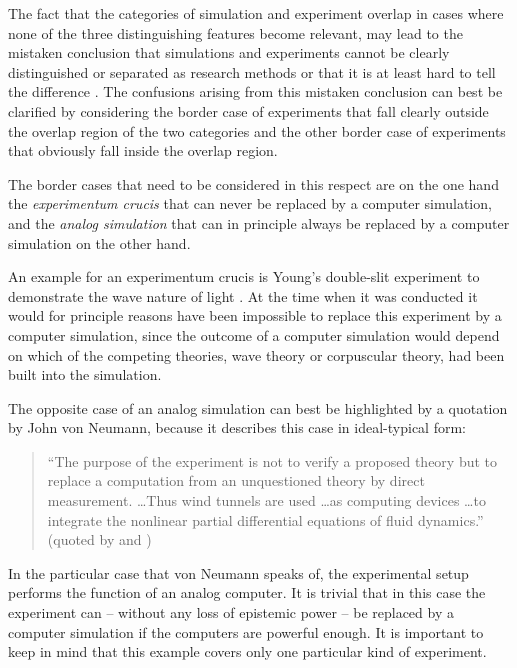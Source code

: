 \documentclass[onecollarge]{STJour}
\numberwithin{equation}{section}
\begin{document}
The fact that the categories of simulation and experiment  overlap in cases where none of the three distinguishing features become relevant, may lead to the mistaken conclusion that simulations and experiments cannot be clearly distinguished or separated as research methods or that it is at least hard to tell the difference \citep{morrison:2009, parker:2009}. The confusions arising from this mistaken conclusion can best be clarified by considering the border case of experiments that fall clearly outside the overlap region of the two categories and the other border case of experiments that obviously fall inside the overlap region.

 The border cases that need to be considered in this respect are on the one hand the \emph{experimentum crucis} that can never be replaced by a computer simulation, and the \emph{analog simulation} that can in principle always be replaced by a computer simulation on the other hand.

An\label{experimentumCrucis} example for an experimentum crucis is
Young's double-slit experiment to demonstrate the wave nature of light \citep{wikipedia:double_slit}. At the time when it was conducted it would for principle reasons have been impossible to
replace this experiment by a computer simulation, since the outcome of a computer simulation would depend on which of the competing theories, wave theory or corpuscular theory, had been built into the simulation.

The opposite case of an analog simulation can best be highlighted by a quotation by John von Neumann, because it describes this case in ideal-typical form:\label{windTube}

\begin{quotation}
``The purpose of the experiment is not to verify a proposed theory but to replace a computation from an unquestioned theory by direct measurement. \ldots Thus wind tunnels are used \ldots as computing devices \ldots to integrate the nonlinear partial differential equations of fluid dynamics.'' (quoted by \citet[p. 28]{winkler-et-al:1987} and \citet[p. 35]{winsberg:2010})
\end{quotation}

In the particular case that von Neumann speaks of, the experimental setup performs the function of an analog computer. It is trivial that in this case the experiment can -- without any loss of epistemic power -- be replaced by a computer simulation if the computers are powerful enough. It is important to keep in mind that this example covers only one particular kind of experiment.
\end{document}
